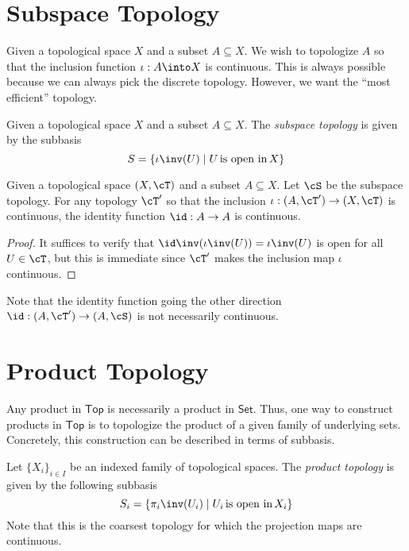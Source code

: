 \documentclass{amsart}
\begin{document}
\section{Subspace Topology}
\label{sec:subspace-topology}

Given a topological space $X$ and a subset $A \subseteq X$.
We wish to topologize $A$ so that the inclusion function $\iota : A \into X$ is continuous.
This is always possible because we can always pick the discrete topology.
However, we want the ``most efficient'' topology.

\begin{defn}
  Given a topological space $X$ and a subset $A \subseteq X$.
  The \emph{subspace topology} is given by the subbasis
  \[
    S = \{\iota\inv(U) \mid U\,\text{is open in}\,X\}
  \]
\end{defn}

\begin{lem}
  Given a topological space $(X, \cT)$ and a subset $A \subseteq X$.
  Let $\cS$ be the subspace topology.
  For any topology $\cT'$ so that the inclusion $\iota : (A, \cT') \to (X, \cT)$ is continuous, the identity function $\id : A \to A$ is continuous.
  
\end{lem}
\begin{proof}
  It suffices to verify that $\id\inv(\iota\inv(U)) = \iota\inv(U)$ is open for all $U \in \cT$, but this is immediate since $\cT'$ makes the inclusion map $\iota$ continuous.
\end{proof}
Note that the identity function going the other direction $\id : (A, \cT') \to (A, \cS)$ is not necessarily continuous.

\section{Product Topology}
\label{sec:product-topology}

Any product in $\mathsf{Top}$ is necessarily a product in $\mathsf{Set}$.
Thus, one way to construct products in $\mathsf{Top}$ is to topologize the product of a given family of underlying sets.
Concretely, this construction can be described in terms of subbasis.

\begin{defn}
  Let $\{X_{i}\}_{i \in I}$ be an indexed family of topological spaces.
  The \emph{product topology} is given by the following subbasis
  \[
    S_{i} = \{\pi_{i}\inv(U_{i}) \mid U_{i}\,\text{is open in}\,X_{i}\}
  \]
  Note that this is the coarsest topology for which the projection maps are continuous.
\end{defn}
\end{document}
